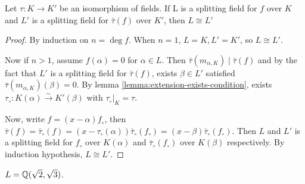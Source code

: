 \begin{theorem}
  Let $\tau: K \to K'$ be an isomorphism of fields.
  If L is a splitting field for $f$ over $K$ and $L'$ is a splitting field for $\bar\tau(f)$
  over $K'$, then $L \cong L'$

\begin{proof}
  By induction on $n = \deg f$. When $n = 1$, $L = K, L' = K'$, so $L \cong L'$.

  Now if $n > 1$, assume $f(\alpha) = 0$ for $\alpha \in L$. Then $\bar\tau(m_{\alpha, K}) \mid \bar\tau(f)$
  and by the fact that $L'$ is a splitting field for $\bar\tau(f)$, exists $\beta \in L'$ satisfied
  $\bar\tau(m_{\alpha, K})(\beta) = 0$. By lemma \ref{lemma:extension-exists-condition}, exists $\tau_{\circ}:
  K(\alpha) \xrightarrow\sim K'(\beta)$ with $\tau_\circ \big|_K = \tau$.

  Now, write $f = (x - \alpha) f_\circ$, then $\bar\tau(f) = \bar\tau_\circ(f) = (x - \tau_\circ(\alpha))
  \bar\tau_\circ(f_\circ) = (x - \beta) \bar\tau_\circ(f_\circ)$. Then $L$ and $L'$ is a splitting
  field for $f_{\circ}$ over $K(\alpha)$ and $\bar\tau_\circ(f_\circ)$ over $K(\beta)$ respectively.
  By induction hypothesis, $L \cong L'$.
\end{proof}
\end{theorem}

\begin{example}
  $L = \mathbb{Q}(\sqrt{2}, \sqrt{3})$.
\end{example}
